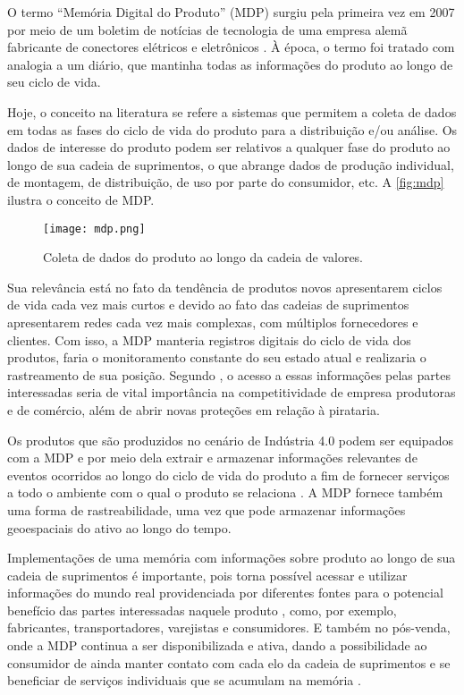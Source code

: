 	O termo ``Memória Digital do Produto'' (MDP) surgiu pela primeira vez em 2007 por meio de um boletim de notícias de tecnologia de uma empresa alemã fabricante de conectores elétricos e eletrônicos \cite{wahlster2007digitalmemory}. À época, o termo foi tratado com analogia a um diário, que mantinha todas as informações do produto ao longo de seu ciclo de vida.
	
	Hoje, o conceito na literatura se refere a sistemas que permitem a coleta de dados em todas as fases do ciclo de vida do produto para a distribuição e/ou análise. Os dados de interesse do produto podem ser relativos a qualquer fase do produto ao longo de sua cadeia de suprimentos, o que abrange dados de produção individual, de montagem, de distribuição, de uso por parte do consumidor, etc. A \autoref{fig:mdp} ilustra o conceito de MDP.
	
	\begin{figure}[htb]
		\centering
		\label{fig:mdp}
		\texttt{[image: mdp.png]}
		\caption{Coleta de dados do produto ao longo da cadeia de valores.}
	\end{figure}
	
	Sua relevância está no fato da tendência de produtos novos apresentarem ciclos de vida cada vez mais curtos e devido ao fato das cadeias de suprimentos apresentarem redes cada vez mais complexas, com múltiplos fornecedores e clientes. Com isso, a MDP manteria registros digitais do ciclo de vida dos produtos, faria o monitoramento constante do seu estado atual e realizaria o rastreamento de sua posição. Segundo , o acesso a essas informações pelas partes interessadas seria de vital importância na competitividade de empresa produtoras e de comércio, além de abrir novas proteções em relação à pirataria.
	
	Os produtos que são produzidos no cenário de Indústria 4.0 podem ser equipados com a MDP e por meio dela extrair e armazenar informações relevantes de eventos ocorridos ao longo do ciclo de vida do produto a fim de fornecer serviços a todo o ambiente com o qual o produto se relaciona \cite{brandherm2011productmemory}. A MDP fornece também uma forma de rastreabilidade, uma vez que pode armazenar informações geoespaciais do ativo ao longo do tempo.
	
	Implementações de uma memória com informações sobre produto ao longo de sua cadeia de suprimentos é importante, pois torna possível acessar e utilizar informações do mundo real providenciada por diferentes fontes para o potencial benefício das partes interessadas naquele produto \cite{brandherm2011productmemory}, como, por exemplo, fabricantes, transportadores, varejistas e consumidores. E também no pós-venda, onde a MDP continua a ser disponibilizada e ativa, dando a possibilidade ao consumidor de ainda manter contato com cada elo da cadeia de suprimentos e se beneficiar de serviços individuais que se acumulam na memória \cite{brandherm2011productmemory}.
	
